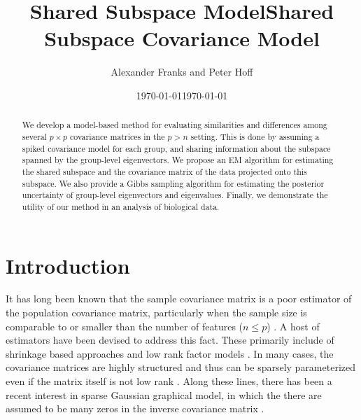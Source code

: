 \documentclass{article}
\begin{document}
\title{Shared Subspace Model}


\date{\today}


\title{Shared Subspace Covariance Model}
\author{Alexander Franks and Peter Hoff}
\date{\today}
\maketitle 

\begin{abstract}


  We develop a model-based method for evaluating similarities and
  differences among several $p\times p$ covariance matrices in the
  $p > n$ setting.  This is done by assuming a spiked covariance model
  for each group, and sharing information about the subspace spanned
  by the group-level eigenvectors.  We propose an EM algorithm for
  estimating the shared subspace and the covariance matrix of the data
  projected onto this subspace.  We also provide a Gibbs sampling
  algorithm for estimating the posterior uncertainty of group-level
  eigenvectors and eigenvalues.  Finally, we demonstrate the utility
  of our method in an analysis of biological data.

\end{abstract}

\section{Introduction}

It has long been known that the sample covariance matrix is a poor
estimator of the population covariance matrix, particularly when the
sample size is comparable to or smaller than the number of features
($n \leq p$) \citep{Dempster1969, Stein1975}.  A host of estimators
have been devised to address this fact. These primarily include of
shrinkage based approaches \citep{Schafer2005, Ledoit2011} and low
rank factor models \citep{Mardia1980, Ullman2003, Fan2008}.  In many
cases, the covariance matrices are highly structured and thus can be
sparsely parameterized even if the matrix itself is not low rank
\citep{Burg1982, Williams1993} .  Along these lines, there has been a
recent interest in sparse Gaussian graphical model, in which the there
are assumed to be many zeros in the inverse covariance matrix
\citep{Meinshausen2006, Friedman2008}.
\end{document}
